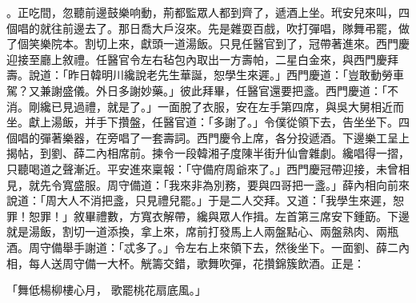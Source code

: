 \begin{showcontents}{}
。正吃間，忽聽前邊鼓樂响動，荊都監眾人都到齊了，遞酒上坐。玳安兒來叫，四個唱的就往前邊去了。那日喬大戶沒來。先是雜耍百戲，吹打彈唱，隊舞弔罷，做了個笑樂院本。割切上來，獻頭一道湯飯。只見任醫官到了，冠帶著進來。西門慶迎接至廳上敘禮。任醫官令左右毡包內取出一方壽帕，二星白金來，與西門慶拜壽。說道：「昨日韓明川纔說老先生華誕，恕學生來遲。」西門慶道：「豈敢動勞車駕？又兼謝盛儀。外日多謝妙藥。」彼此拜畢，任醫官還要把盞。西門慶道：「不消。剛纔已見過禮，就是了。」一面脫了衣服，安在左手第四席，與吳大舅相近而坐。獻上湯飯，并手下攢盤，任醫官道：「多謝了。」令僕從領下去，告坐坐下。四個唱的彈著樂器，在旁唱了一套壽詞。西門慶令上席，各分投遞酒。下邊樂工呈上揭帖，到劉、薛二內相席前。揀令一段韓湘子度陳半街升仙會雜劇。纔唱得一摺，只聽喝道之聲漸近。平安進來稟報：「守備府周爺來了。」西門慶冠帶迎接，未曾相見，就先令寬盛服。周守備道：「我來非為別務，要與四哥把一盞。」薛內相向前來說道：「周大人不消把盞，只見禮兒罷。」于是二人交拜。又道：「我學生來遲，恕罪！恕罪！」敘畢禮數，方寬衣解帶，纔與眾人作揖。左首第三席安下鍾筯。下邊就是湯飯，割切一道添換，拿上來，席前打發馬上人兩盤點心、兩盤熟肉、兩瓶酒。周守備舉手謝道：「忒多了。」令左右上來領下去，然後坐下。一面劉、薛二內相，每人送周守備一大杯。觥籌交錯，歌舞吹彈，花攢錦簇飲酒。正是：

「舞低楊柳樓心月，  歌罷桃花扇底風。」


\end{showcontents}
